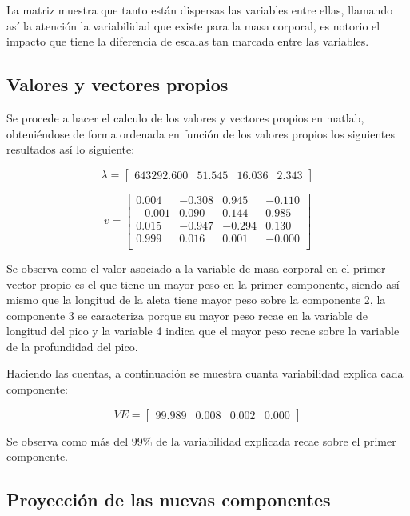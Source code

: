 \documentclass[11pt, letterpaper]{article}
\begin{document}
La matriz muestra que tanto están dispersas las variables entre ellas, llamando así la atención la variabilidad que existe para la masa corporal, es notorio el impacto que tiene la diferencia de escalas tan marcada entre las variables.

\newpage

\subsection{Valores y vectores propios}

Se procede a hacer el calculo de los valores y vectores propios en matlab, obteniéndose de forma ordenada en función de los valores propios los siguientes resultados así lo siguiente:

$$\lambda = 
\begin{bmatrix}
	643292.600 &
	51.545 &
	16.036 &
	2.343 
\end{bmatrix}
$$

$$v = 
\begin{bmatrix}
	0.004 & -0.308 & 0.945 & -0.110 \\
	-0.001 & 0.090 & 0.144 & 0.985 \\
	0.015 & -0.947 & -0.294 & 0.130 \\
	0.999 & 0.016 & 0.001 & -0.000 \\
\end{bmatrix}
$$

Se observa como el valor asociado a la variable de masa corporal en el primer vector propio es el que tiene un mayor peso en la primer componente, siendo así mismo que la longitud de la aleta tiene mayor peso sobre la componente 2, la componente 3 se caracteriza porque su mayor peso recae en la variable de longitud del pico y la variable 4 indica que el mayor peso recae sobre la variable de la profundidad del pico.

Haciendo las cuentas, a continuación se muestra cuanta variabilidad explica cada componente:

$$VE = 
\begin{bmatrix}
	99.989 &
	0.008 &
	0.002 &
	0.000 
\end{bmatrix}
$$



Se observa como más del 99\% de la variabilidad explicada recae sobre el primer componente.


\newpage

\subsection{Proyección de las nuevas componentes}
\end{document}
